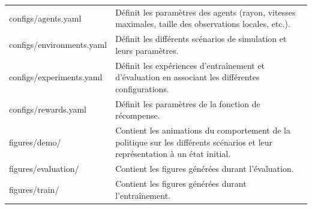 \begin{longtable}{
        >{\ttfamily\small}p{}
        p{}
    }
    configs/agents.yaml
                                             & Définit les paramètres des agents (rayon, vitesses maximales, taille des observations locales, etc.).                                                                                                                                               \\

    configs/environments.yaml
                                             & Définit les différents scénarios de simulation et leurs paramètres.                                                                                                                                                                                 \\

    configs/experiments.yaml
                                             & Définit les expériences d'entraînement et d'évaluation en associant les différentes configurations.                                                                                                                                                 \\

    configs/rewards.yaml
                                             & Définit les paramètres de la fonction de récompense.                                                                                                                                                                                                \\

    figures/demo/
                                             & Contient les animations du comportement de la politique sur les différents scénarios et leur représentation à un état initial.                                                                                                                      \\

    figures/evaluation/
                                             & Contient les figures générées durant l'évaluation.                                                                                                                                                                                                  \\

    figures/train/
                                             & Contient les figures générées durant l'entraînement.                                                                                                                                                                                                \\


\end{longtable}
